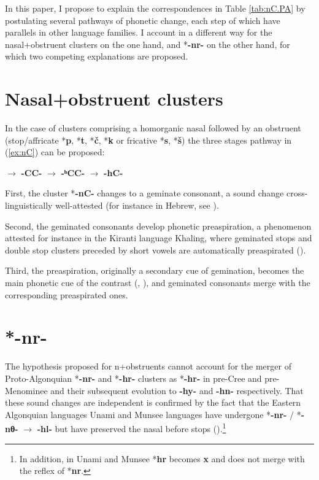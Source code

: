 \documentclass[oneside,a4paper,11pt]{article}
\newcommand{\ipa}[1]{{\phon\mbox{\textbf{#1}}}}
\begin{document}
In this paper, I propose to explain the correspondences in Table \ref{tab:nC.PA} by postulating several pathways of phonetic change, each step of which have parallels in other language families. I account in a different way for the nasal+obstruent clusters on the one hand, and *\ipa{-nr-} on the other hand, for which two competing explanations are proposed.


\section{Nasal+obstruent clusters}
In the case of clusters comprising a homorganic nasal followed by an obstruent (stop/affricate *\ipa{p}, *\ipa{t}, *\ipa{č}, *\ipa{k} or fricative *\ipa{s}, *\ipa{š}) the three stages pathway in (\ref{ex:nC}) can be proposed:

\begin{exe}
\ex \label{ex:nC}
\glt *\ipa{-nC-} $\rightarrow$ \ipa{-CC-} $\rightarrow$ \ipa{-ʰCC-} $\rightarrow$ \ipa{-hC-} 
\end{exe}

First, the cluster *\ipa{-nC-} changes to a geminate consonant, a sound change cross-linguistically well-attested (for instance in Hebrew, see \citealt[71-75]{jouon06}).

Second, the geminated consonants develop phonetic preaspiration, a phenomenon attested for instance in the Kiranti language   Khaling, where geminated stops and double stop clusters preceded by short vowels are automatically preaspirated (\citealt[44]{jacques16tonogenesis}).

Third, the preaspiration, originally a secondary cue of gemination, becomes the main phonetic cue of the contrast (\citealt[172]{kuemmel07wandel}, \citealt{silverman03preaspirated}), and geminated consonants merge with the corresponding preaspirated ones.
  
  
 \section{*-nr-}
The hypothesis proposed for n+obstruents cannot account for the merger of Proto-Algonquian *\ipa{-nr-} and *\ipa{-hr-} clusters as *\ipa{-hr-} in pre-Cree and pre-Menominee and their subsequent evolution to \ipa{-hy-} and \ipa{-hn-} respectively. That these sound changes are independent is confirmed by the fact that the Eastern Algonquian languages Unami and Munsee languages have undergone *\ipa{-nr-} / *\ipa{-nθ-} $\rightarrow$ \ipa{-hl-} but have preserved the nasal before stops (\citealt[25]{goddard82munsee}).\footnote{In addition, in Unami and Munsee *\ipa{hr} becomes \ipa{x} and does not merge with the reflex of *\ipa{nr}.}
\end{document}
